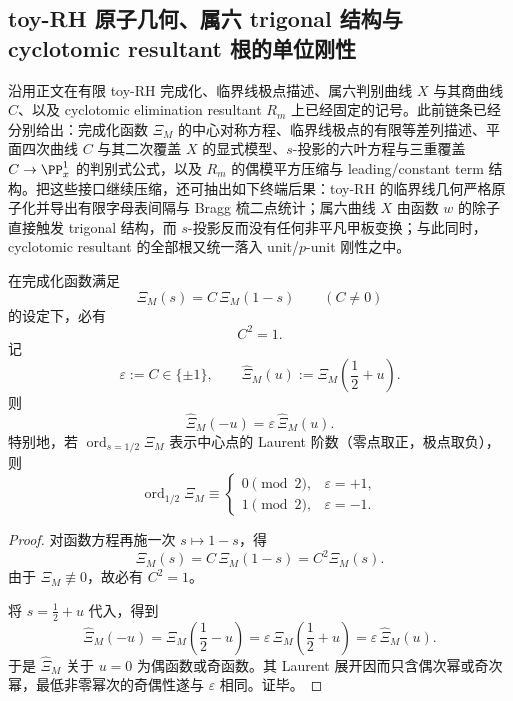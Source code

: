 \subsection{toy-RH 原子几何、属六 trigonal 结构与 cyclotomic resultant 根的单位刚性}\label{subsec:conclusion-atomic-toyrh-trigonal-resultant-unit-rigidity}
沿用正文在有限 toy-RH 完成化、临界线极点描述、属六判别曲线 \(X\) 与其商曲线 \(C\)、以及 cyclotomic elimination resultant \(R_m\) 上已经固定的记号。此前链条已经分别给出：完成化函数 \(\Xi_M\) 的中心对称方程、临界线极点的有限等差列描述、平面四次曲线 \(C\) 与其二次覆盖 \(X\) 的显式模型、\(s\)-投影的六叶方程与三重覆盖 \(C\to \PP^1_x\) 的判别式公式，以及 \(R_m\) 的偶模平方压缩与 leading/constant term 结构。把这些接口继续压缩，还可抽出如下终端后果：toy-RH 的临界线几何严格原子化并导出有限字母表间隔与 Bragg 梳二点统计；属六曲线 \(X\) 由函数 \(w\) 的除子直接触发 trigonal 结构，而 \(s\)-投影反而没有任何非平凡甲板变换；与此同时，cyclotomic resultant 的全部根又统一落入 unit/\(p\)-unit 刚性之中。

\begin{theorem}[完成化符号的刚性与中心阶数的奇偶律]\label{thm:conclusion-toyrh-completion-sign-center-parity}
在完成化函数满足
\[
\Xi_M(s)=C\,\Xi_M(1-s)
\qquad (C\neq 0)
\]
的设定下，必有
\[
C^2=1.
\]
记
\[
\varepsilon:=C\in\{\pm 1\},
\qquad
\widehat\Xi_M(u):=\Xi_M\!\left(\frac12+u\right).
\]
则
\[
\widehat\Xi_M(-u)=\varepsilon\,\widehat\Xi_M(u).
\]
特别地，若 \(\operatorname{ord}_{s=1/2}\Xi_M\) 表示中心点的 Laurent 阶数（零点取正，极点取负），则
\[
\operatorname{ord}_{1/2}\Xi_M\equiv
\begin{cases}
0 \pmod 2,& \varepsilon=+1,\\
1 \pmod 2,& \varepsilon=-1.
\end{cases}
\]
\end{theorem}
\begin{proof}
对函数方程再施一次 \(s\mapsto 1-s\)，得
\[
\Xi_M(s)=C\,\Xi_M(1-s)=C^2\Xi_M(s).
\]
由于 \(\Xi_M\not\equiv 0\)，故必有 \(C^2=1\)。

将 \(s=\frac12+u\) 代入，得到
\[
\widehat\Xi_M(-u)=\Xi_M\!\left(\frac12-u\right)
=\varepsilon\,\Xi_M\!\left(\frac12+u\right)
=\varepsilon\,\widehat\Xi_M(u).
\]
于是 \(\widehat\Xi_M\) 关于 \(u=0\) 为偶函数或奇函数。其 Laurent 展开因而只含偶次幂或奇次幂，最低非零幂次的奇偶性遂与 \(\varepsilon\) 相同。证毕。
\end{proof}


